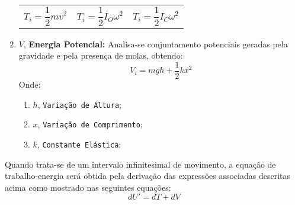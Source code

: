 \documentclass{article}
\begin{document}
\begin{enumerate}[rightmargin = \leftmargin, noitemsep]
\begin{center}
\begin{tabularx}{0.8\textwidth}{@{}XXX@{}}
\begin{equation}
                                    \boxed{
                                        T_{i} = \frac{1}{2}m\overline{v}^{2}
                                    }
                                \end{equation} &
                                \begin{equation}
                                    \boxed{
                                        T_{i} = \frac{1}{2}I_{O}\omega^{2}
                                    }
                                \end{equation} &
                                \begin{equation}
                                    \boxed{
                                        T_{i} = \frac{1}{2}I_{C}\omega^{2}
                                    }
                                \end{equation}\\
                            \end{tabularx}
                        \end{center}


                    \item $V$, \textbf{Energia Potencial:} Analisa-se conjuntamento potenciais geradas pela gravidade e pela presença de molas, obtendo:
                        \begin{equation}
                            \boxed{
                                V_{i} = 
                                m g h +
                                \frac{1}{2} k x^{2} 
                            }
                        \end{equation}
                    Onde:
                        \begin{enumerate}[rightmargin = \leftmargin, noitemsep]
                            \item $h$, \texttt{Variação de Altura};
                            \item $x$, \texttt{Variação de Comprimento};
                            \item $k$, \texttt{Constante Elástica};
                        \end{enumerate}
                \end{enumerate}
            Quando trata-se de um intervalo infinitesimal de movimento, a equação de trabalho-energia será obtida pela derivação das expressões associadas descritas acima como mostrado nas seguintes equações:
                \begin{equation}
                    \boxed{
                        dU' = dT + dV
                    }
                \end{equation}
\end{document}
